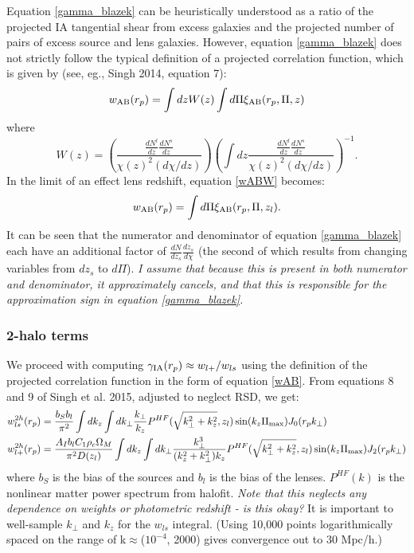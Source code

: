 \documentclass[onecolumn,amsmath,aps,fleqn, superscriptaddress]{revtex4}
\begin{document}
Equation \ref{gamma_blazek} can be heuristically understood as a ratio of the projected IA tangential shear from excess galaxies and the projected number of pairs of excess source and lens galaxies. However, equation \ref{gamma_blazek} does not strictly follow the typical definition of a projected correlation function, which is given by (see, eg., Singh 2014, equation 7):
\begin{equation}
w_{\rm AB}(r_p) = \int dz W(z) \int d\Pi \xi_{\rm AB}(r_p, \Pi, z)
\label{wABW}
\end{equation}
where 
\begin{equation}
W(z) = \left(\frac{\frac{dN^l}{dz}\frac{dN^s}{dz}}{\chi(z)^2 (d\chi/dz)}\right) \left(\int dz \frac{\frac{dN^l}{dz}\frac{dN^s}{dz}}{\chi(z)^2 (d\chi/dz)}\right)^{-1}.
\label{wz}
\end{equation}
In the limit of an effect lens redshift, equation \ref{wABW} becomes:
\begin{equation}
w_{\rm AB}(r_p) = \int d\Pi \xi_{\rm AB}(r_p, \Pi, z_l).
\label{wAB}
\end{equation}
It can be seen that the numerator and denominator of equation \ref{gamma_blazek} each have an additional factor of $\frac{dN}{dz_s}\frac{dz_s}{d\chi}$ (the second of which results from changing variables from $dz_s$ to $d\Pi$). {\it I assume that because this is present in both numerator and denominator, it approximately cancels, and that this is responsible for the approximation sign in equation \ref{gamma_blazek}.} 

\subsubsection*{2-halo terms}
We proceed with computing $\gamma_{\rm IA}(r_p) \approx w_{l+} / w_{ls}$ using the definition of the projected correlation function in the form of equation \ref{wAB}. From equations 8 and 9 of Singh et al. 2015, adjusted to neglect RSD, we get:
\begin{align}
w_{ls}^{2h}(r_p) &= \frac{b_S b_l}{\pi^2} \int dk_z  \int dk_\perp  \frac{k_\perp}{k_z} P^{HF}(\sqrt{k_\perp^2 + k_z^2}, z_l) \sin(k_z \Pi_{\rm max}) J_0(r_p k_\perp) \nonumber \\
w_{l+}^{2h}(r_p) &= \frac{A_I b_l C_1 \rho_c \Omega_M}{\pi^2 D(z_l)} \int dk_z  \int dk_\perp  \frac{k_\perp^3 }{(k_z^2 + k_\perp^2)k_z} P^{HF}(\sqrt{k_\perp^2 + k_z^2}, z_l) \sin(k_z \Pi_{\rm max}) J_2(r_p k_\perp)
\label{ws}
\end{align}
where $b_S$ is the bias of the sources and $b_l$ is the bias of the lenses. $P^{HF}(k)$ is the nonlinear matter power spectrum from halofit. {\it Note that this neglects any dependence on weights or photometric redshift - is this okay?} It is important to well-sample $k_\perp$ and $k_z$ for the $w_{ls}$ integral. (Using 10,000 points logarithmically spaced on the range of k$\approx$($10^{-4}$, 2000) gives convergence out to $30$ Mpc/h.)
\end{document}
